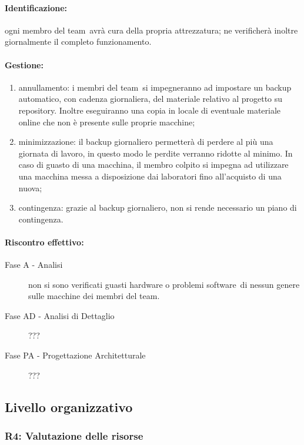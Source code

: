 \documentclass[../PianoProgetto.tex]{subfiles}
\begin{document}
	\paragraph*{Identificazione:} ogni membro del team\g\ avrà cura della propria attrezzatura; ne verificherà inoltre giornalmente il completo funzionamento.
	
	\paragraph*{Gestione:}
	\begin{enumerate}
		\item annullamento: i membri del team\g\ si impegneranno ad impostare un backup automatico, con cadenza giornaliera, del materiale relativo al progetto su repository\g . Inoltre eseguiranno una copia in locale di eventuale materiale online che non è presente sulle proprie macchine;
		\item minimizzazione: il backup giornaliero permetterà di perdere al più una giornata di lavoro, in questo modo le perdite verranno ridotte al minimo. In caso di guasto di una macchina, il membro colpito si impegna ad utilizzare una macchina messa a disposizione dai laboratori fino all'acquisto di una nuova;
		\item contingenza: grazie al backup giornaliero, non si rende necessario un piano di contingenza.
	\end{enumerate} 	
	
	\paragraph*{Riscontro effettivo:}
		\begin{description}
			\item[Fase A - Analisi] non si sono verificati guasti hardware o problemi software\g\ di nessun genere sulle macchine dei membri del team\g .
			\item[Fase AD - Analisi di Dettaglio] ???
			\item[Fase PA - Progettazione Architetturale] ???
		\end{description}

\subsection{Livello organizzativo}

\subsubsection{R4: Valutazione delle risorse}
\end{document}
